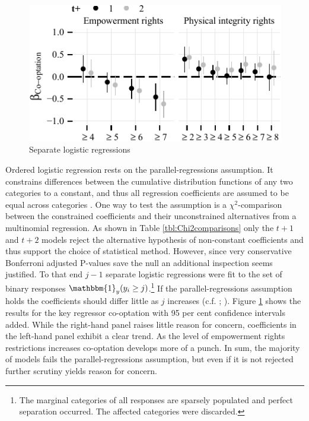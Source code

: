 \begin{figure}
\centering
\includegraphics[width=\linewidth]{./sections/03replication/parallelRegressionsCoefPlot_manualLabels.pdf}
\caption{Separate logistic regressions}
\label{fig:separateLogisticCoef}
\end{figure}
Ordered logistic regression rests on the 
parallel-regressions assumption. It constrains differences 
between the cumulative distribution functions of any two 
categories to a constant, and thus all regression 
coefficients are assumed to be equal across categories 
\citep[476]{Fox.2008}. One way to test the assumption is a 
$\chi^2$-comparison between the constrained coefficients and 
their unconstrained alternatives from a multinomial 
regression. As shown in Table \ref{tbl:Chi2comparisons} only
the $t+1$ and $t+2$ models reject the alternative hypothesis 
of non-constant coefficients and thus support the choice of
statistical method. However, since very conservative 
Bonferroni adjusted P-values save the null an additional
inspection seems justified. To that end $j-1$ separate 
logistic regressions were fit to the set of binary responses 
$\mathbbm{1}_y(y_{i} \ge j)$.\footnote{The marginal 
categories of all responses are sparsely populated
and perfect separation occurred. The affected categories were 
discarded.} If the parallel-regressions assumption holds 
the coefficients should differ little as $j$ increases 
(c.f. \cite[107ff.]{Ward.08062014}; \cite[123]{Gelman.2006}). 
Figure \ref{fig:separateLogisticCoef} shows the results for 
the key regressor co-optation with 95 per cent confidence 
intervals added. While the right-hand panel raises little 
reason for concern, coefficients in the left-hand panel 
exhibit a clear trend. As the level of empowerment rights 
restrictions increases co-optation develops more of a punch.
In sum, the majority of models fails the 
parallel-regressions assumption, but even if it is not 
rejected further scrutiny yields reason for concern.


